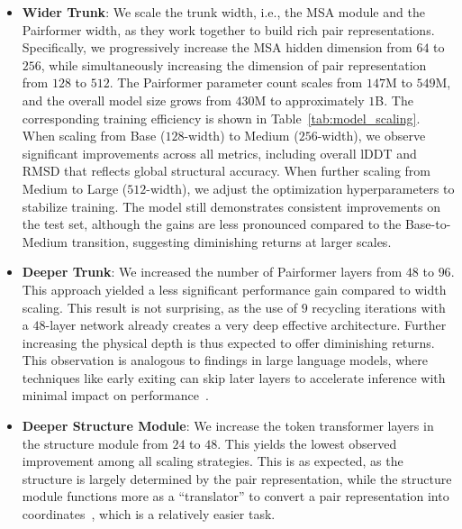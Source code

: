 \documentclass[]{bytedance_seed}
\newcommand{\todoq}[2][]{\todo[size=\scriptsize,color=orange!20!white,#1]{Quanquan: #2}}
\begin{document}
\begin{itemize}
    \item \textbf{Wider Trunk}: We scale the trunk width, i.e., the MSA module and the Pairformer width, as they work together to build rich pair representations. Specifically, we progressively increase the MSA hidden dimension from $64$ to $256$, while simultaneously increasing the dimension of pair representation from $128$ to $512$. The Pairformer parameter count scales from $147$M to $549$M, and the overall model size grows from $430$M to approximately $1$B. The corresponding training efficiency is shown in Table~\ref{tab:model_scaling}. 
    When scaling from Base ($128$-width) to Medium ($256$-width), we observe significant improvements across all metrics, including overall lDDT and RMSD that reflects global structural accuracy. When further scaling from Medium to Large ($512$-width), we adjust the optimization hyperparameters to stabilize training. The model still demonstrates consistent improvements on the test set, although the gains are less pronounced compared to the Base-to-Medium transition, suggesting diminishing returns at larger scales.
    
    \item \textbf{Deeper Trunk}: We increased the number of Pairformer layers from $48$ to $96$. This approach yielded a less significant performance gain compared to width scaling. This result is not surprising, as the use of $9$ recycling iterations with a $48$-layer network already creates a very deep effective architecture. Further increasing the physical depth is thus expected to offer diminishing returns. This observation is analogous to findings in large language models, where techniques like early exiting can skip later layers to accelerate inference with minimal impact on performance~\cite{elhoushi2024layerskip}.
    
    \item \textbf{Deeper Structure Module}: We increase the token transformer layers in the structure module from $24$ to $48$. This yields the lowest observed improvement among all scaling strategies. This is as expected, as the structure is largely determined by the pair representation, while the structure module functions more as a ``translator'' to convert a pair representation into coordinates~\cite{lin2023evolutionary}, which is a relatively easier task.
\end{itemize}
\end{document}
